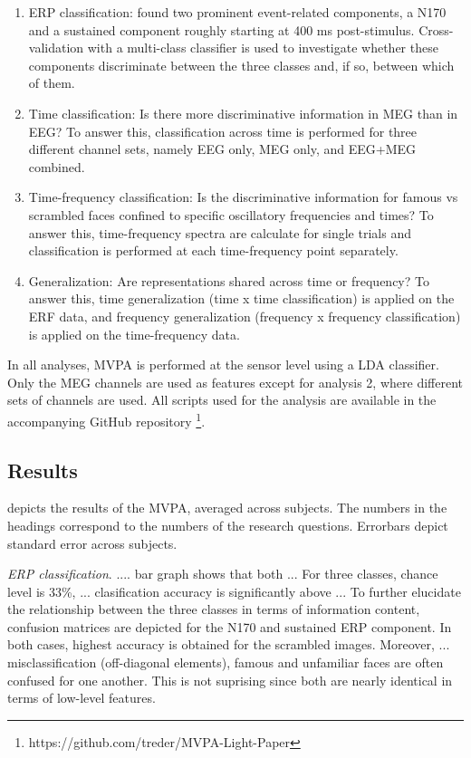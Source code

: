 \documentclass[utf8]{frontiersSCNS} %
\begin{document}
\begin{enumerate}
    \item ERP classification: \cite{Wakeman2015ADataset} found two prominent event-related components, a N170 and a sustained component roughly starting at 400 ms post-stimulus. Cross-validation with a multi-class classifier is used to investigate whether these components discriminate between the three classes and, if so, between which of them.
    \item Time classification: Is there more discriminative information in MEG than in EEG? To answer this, classification across time is performed for three different channel sets, namely EEG only, MEG only, and EEG+MEG combined. 
    \item Time-frequency classification: Is the discriminative information for famous vs scrambled faces confined to specific oscillatory frequencies and times? To answer this, time-frequency spectra are calculate for single trials and classification is performed at each time-frequency point separately. 
    \item Generalization: Are representations shared across time \citep{King2014} or frequency? To answer this, time generalization (time x time classification) is applied on the ERF data, and frequency generalization (frequency x frequency classification) is applied on the time-frequency data.
\end{enumerate}

In all analyses, MVPA is performed at the sensor level using a LDA classifier. Only the MEG channels are used as features except for analysis 2, where different sets of channels are used. All scripts used for the analysis are available in the accompanying GitHub repository \footnote{https://github.com/treder/MVPA-Light-Paper}.

\subsection{Results}

 depicts the results of the MVPA, averaged across subjects. The numbers in the headings correspond to the numbers of the research questions. Errorbars depict standard error across subjects.

\textit{ERP classification}. .... bar graph shows that both ... For three classes, chance level is 33\%, ... clasification accuracy is significantly above ... To further elucidate the relationship between the three classes in terms of information content, confusion matrices are depicted for the N170 and sustained ERP component. In both cases, highest accuracy is obtained for the scrambled images. Moreover, ... misclassification (off-diagonal elements), famous and unfamiliar faces are often confused for one another. This is not suprising since both are nearly identical in terms of low-level features. 
\end{document}
